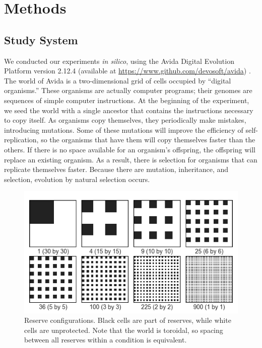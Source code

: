 \documentclass[letterpaper]{article}
\begin{document}
\section{Methods}
\subsection{Study System}
We conducted our experiments \textit{in silico}, using the Avida Digital Evolution Platform version 2.12.4 (available at \href{url}{https://www.github.com/devosoft/avida}) \citep{ofria_avida:_2004}. The world of Avida is a two-dimensional grid of cells occupied by “digital organisms.” These organisms are actually computer programs; their genomes are sequences of simple computer instructions. At the beginning of the experiment, we seed the world with a single ancestor that contains the instructions necessary to copy itself. As organisms copy themselves, they periodically make mistakes, introducing mutations. Some of these mutations will improve the efficiency of self-replication, so the organisms that have them will copy themselves faster than the others. If there is no space available for an organism’s offspring, the offspring will replace an existing organism. As a result, there is selection for organisms that can replicate themselves faster. Because there are mutation, inheritance, and selection, evolution by natural selection occurs. 

\begin{figure}[h]
	\centering
	\includegraphics[]{reserves.png}
    \caption{Reserve configurations. Black cells are part of reserves, while white cells are unprotected. Note that the world is toroidal, so spacing between all reserves within a condition is equivalent.}
    \label{fig:reserveconfigs}
\end{figure}
\end{document}
